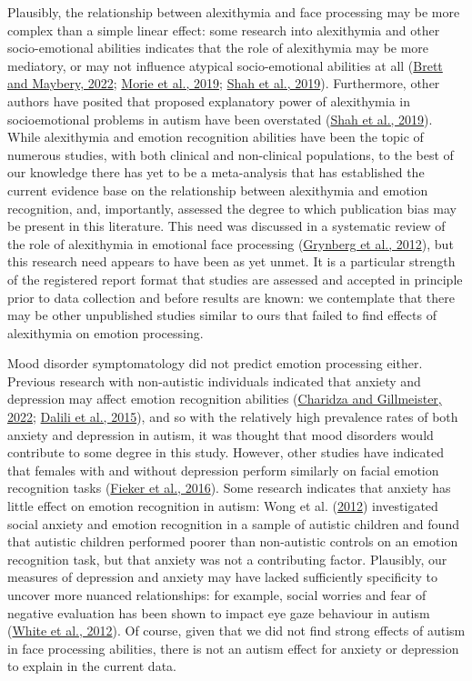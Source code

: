\documentclass[
]{article}
\begin{document}
Plausibly, the relationship between alexithymia and face processing may be more complex than a simple linear effect: some research into alexithymia and other socio-emotional abilities indicates that the role of alexithymia may be more mediatory, or may not influence atypical socio-emotional abilities at all (\protect\hyperlink{ref-brett2022a}{Brett and Maybery, 2022}; \protect\hyperlink{ref-morie2019a}{Morie et al., 2019}; \protect\hyperlink{ref-shah2019a}{Shah et al., 2019}). Furthermore, other authors have posited that proposed explanatory power of alexithymia in socioemotional problems in autism have been overstated (\protect\hyperlink{ref-shah2019a}{Shah et al., 2019}). While alexithymia and emotion recognition abilities have been the topic of numerous studies, with both clinical and non-clinical populations, to the best of our knowledge there has yet to be a meta-analysis that has established the current evidence base on the relationship between alexithymia and emotion recognition, and, importantly, assessed the degree to which publication bias may be present in this literature. This need was discussed in a systematic review of the role of alexithymia in emotional face processing (\protect\hyperlink{ref-grynberg2012a}{Grynberg et al., 2012}), but this research need appears to have been as yet unmet. It is a particular strength of the registered report format that studies are assessed and accepted in principle prior to data collection and before results are known: we contemplate that there may be other unpublished studies similar to ours that failed to find effects of alexithymia on emotion processing.

Mood disorder symptomatology did not predict emotion processing either. Previous research with non-autistic individuals indicated that anxiety and depression may affect emotion recognition abilities (\protect\hyperlink{ref-charidza2022a}{Charidza and Gillmeister, 2022}; \protect\hyperlink{ref-dalili2015a}{Dalili et al., 2015}), and so with the relatively high prevalence rates of both anxiety and depression in autism, it was thought that mood disorders would contribute to some degree in this study. However, other studies have indicated that females with and without depression perform similarly on facial emotion recognition tasks (\protect\hyperlink{ref-fieker2016a}{Fieker et al., 2016}). Some research indicates that anxiety has little effect on emotion recognition in autism: Wong et al. (\protect\hyperlink{ref-wong2012a}{2012}) investigated social anxiety and emotion recognition in a sample of autistic children and found that autistic children performed poorer than non-autistic controls on an emotion recognition task, but that anxiety was not a contributing factor. Plausibly, our measures of depression and anxiety may have lacked sufficiently specificity to uncover more nuanced relationships: for example, social worries and fear of negative evaluation has been shown to impact eye gaze behaviour in autism (\protect\hyperlink{ref-white2012a}{White et al., 2012}). Of course, given that we did not find strong effects of autism in face processing abilities, there is not an autism effect for anxiety or depression to explain in the current data.
\end{document}
